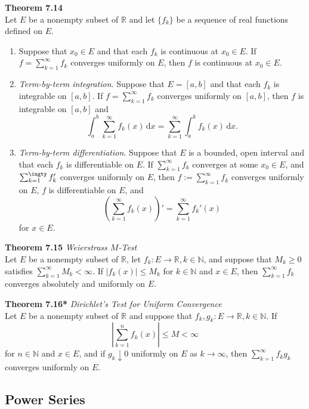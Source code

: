 \documentclass[8pt,landscape]{article}
\begin{document}
\begin{multicols}{3}
\textbf{Theorem 7.14} \\
Let $E$ be a nonempty subset of $\mathbb{R}$ and let $\{f_k\}$ be a sequence of real
functions defined on $E$.
\begin{enumerate}
    \item Suppose that $x_0 \in E$ and that each $f_k$ is continuous at $x_0 \in E$.
        If $f = \sum_{k=1}^\infty f_k$ converges uniformly on $E$, then $f$ is
        continuous at $x_0 \in E$.
    \item \emph{Term-by-term integration}.
        Suppose that $E = [a, b]$ and that each $f_k$ is integrable on $[a, b]$.
        If $f = \sum_{k=1}^\infty f_k$ converges uniformly on $[a, b]$, then $f$
        is integrable on $[a, b]$ and
        \[
            \int_a^b \sum_{k=1}^\infty f_k(x)\, \mathrm{d}x =
            \sum_{k=1}^\infty \int_a^b f_k(x)\, \mathrm{d}x.
        \]
    \item \emph{Term-by-term differentiation}.
        Suppose that $E$ is a bounded, open interval and that each $f_k$ is
        differentiable on $E$.
        If $\sum_{k=1}^\infty f_k$ converges at some $x_0 \in E$,
        and $\sum_{k=1}^\ingty f_k'$ converges uniformly on $E$,
        then $f := \sum_{k=1}^\infty f_k$ converges uniformly on $E$,
        $f$ is differentiable on $E$, and
        \[
            \left( \sum_{k=1}^\infty f_k(x) \right)' =
            \sum_{k=1}^\infty f_k'(x)
        \]
        for $x \in E$.
\end{enumerate}

\textbf{Theorem 7.15} \emph{Weierstrass $M$-Test} \\
Let $E$ be a nonempty subset of $\mathbb{R}$,
let $f_k : E \to \mathbb{R}, k \in \mathbb{N}$,
and suppose that $M_k \geq 0$ satisfies $\sum_{k=1}^\infty M_k < \infty$.
If $|f_k(x)| \leq M_k$ for $k \in \mathbb{N}$ and $x \in E$, then
$\sum_{k=1}^\infty f_k$ converges absolutely and uniformly on $E$.

\textbf{Theorem 7.16*} \emph{Dirichlet's Test for Uniform Convergence} \\
Let $E$ be a nonempty subset of $\mathbb{R}$ and suppose that
$f_k, g_k : E \to \mathbb{R}, k \in \mathbb{N}$.
If
\[
    \left| \sum_{k=1}^n f_k(x) \right| \leq M < \infty
\]
for $n \in \mathbb{N}$ and $x \in E$, and if $g_k \downarrow 0$ uniformly on $E$
as $k \to \infty$, then $\sum_{k=1}^\infty f_k g_k$ converges uniformly on $E$.

\subsection{Power Series}


\end{multicols}
\end{document}
